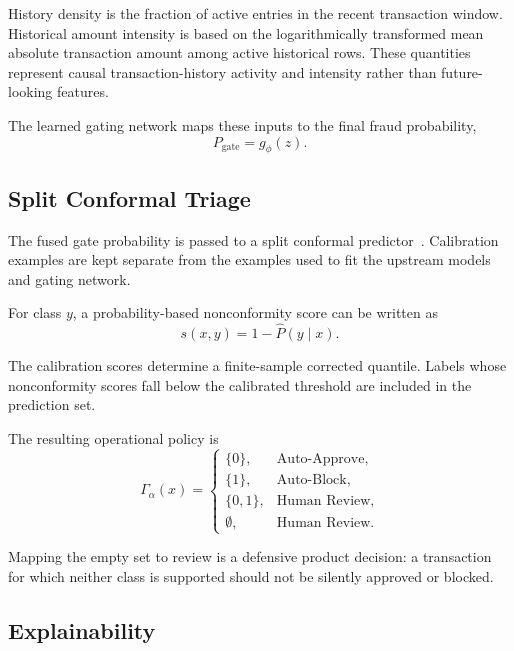 \documentclass[conference]{IEEEtran}
\begin{document}
History density is the fraction of active entries in the recent transaction
window. Historical amount intensity is based on the logarithmically transformed
mean absolute transaction amount among active historical rows. These quantities
represent causal transaction-history activity and intensity rather than
future-looking features.

The learned gating network maps these inputs to the final fraud probability,
\begin{equation}
P_{\mathrm{gate}} = g_{\phi}(z).
\end{equation}

\subsection{Split Conformal Triage}

The fused gate probability is passed to a split conformal
predictor~\cite{vovk2005algorithmic,angelopoulos2023gentle}. Calibration
examples are kept separate from the examples used to fit the upstream models
and gating network.

For class $y$, a probability-based nonconformity score can be written as
\begin{equation}
s(x,y)=1-\hat{P}(y\mid x).
\end{equation}

The calibration scores determine a finite-sample corrected quantile. Labels
whose nonconformity scores fall below the calibrated threshold are included in
the prediction set.

The resulting operational policy is
\begin{equation}
\Gamma_{\alpha}(x)=
\begin{cases}
\{0\}, & \text{Auto-Approve},\\
\{1\}, & \text{Auto-Block},\\
\{0,1\}, & \text{Human Review},\\
\emptyset, & \text{Human Review}.
\end{cases}
\end{equation}

Mapping the empty set to review is a defensive product decision: a transaction
for which neither class is supported should not be silently approved or blocked.

\subsection{Explainability}
\end{document}
